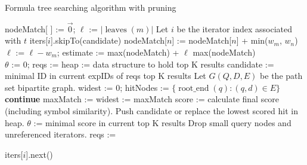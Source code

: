 \documentclass[runningheads]{llncs}
\begin{document}
\begin{algorithm}[!b]
\scriptsize
\caption{Formula tree searching algorithm with pruning}
\label{alg1}
\begin{algorithmic}[1]
	\State nodeMatch[ ] := $\vec{0}$; $\ell$ := $|\operatorname{leaves}(m)|$
 	    \State Let $i$ be the iterator index associated with $t$
			\State iters[$i$].skipTo(candidate)
		\EndIf
 			\State nodeMatch[$n$] := nodeMatch[$n$] + min($w_m$, $w_n$)
 		\EndFor
		\EndIf
		\State $\ell$ := $\ell - w_m$; estimate := max(nodeMatch) + $\ell$ 
			\State {}
		\EndIf
 	\EndFor
 	\State \Return max(nodeMatch)
\EndFunction
~\\
	\State $\theta$ := $0$; reqs := 
	\State heap := data structure to hold top K results
		\State candidate := minimal ID in current expIDs of reqs
			\State \Return top K results
		\EndIf
		\State Let $G(Q, D, E)$ be the path set bipartite graph.
		\State widest := 0; hitNodes := $\{\operatorname{root\_end}(q): (q, d) \in E \}$
				\State \textbf{continue}
			\EndIf
			\State maxMatch := 
			 widest := maxMatch  \EndIf
		\EndFor
		    \State score := calculate final score (including symbol similarity).
				\State Push candidate or replace the lowest scored hit in heap.
					\State $\theta$ := minimal score in current top K results
					\State Drop small query nodes and unreferenced iterators.
					\State reqs := 
				\EndIf
			\EndIf
		\EndIf

				iters[$i$].next()
			\EndIf
		\EndFor
	\EndWhile
\EndFunction
\end{algorithmic}
\end{algorithm}
\end{document}

